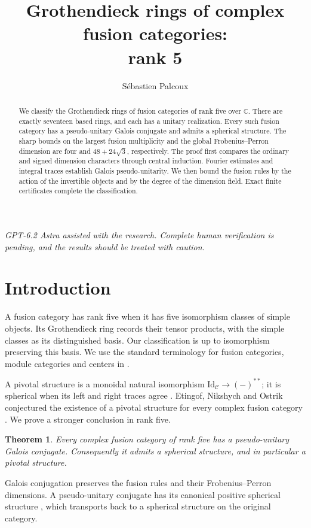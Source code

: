 \documentclass[11pt,a4paper]{article}
\title{Grothendieck rings of complex fusion categories:\\ rank 5}
\author{S\'ebastien Palcoux}\date{}
\newtheorem{maintheorem}{Theorem}
\numberwithin{equation}{section}
\begin{document}
\maketitle
\begin{abstract}
We classify the Grothendieck rings of fusion categories of rank five over
$\mathbb C$. There are exactly seventeen based rings, and each has a
unitary realization. Every such fusion category has a pseudo-unitary
Galois conjugate and admits a spherical structure. The sharp bounds on
the largest fusion multiplicity and the global Frobenius--Perron
dimension are four and $48+24\sqrt3$, respectively. The proof first
compares the ordinary and signed dimension characters through central
induction. Fourier estimates and integral traces establish Galois
pseudo-unitarity. We then bound the fusion rules by the action of the
invertible objects and by the degree of the dimension field. Exact
finite certificates complete the classification.
\end{abstract}
\begin{center}\begin{minipage}{0.88\linewidth}\small\itshape
GPT-6.2 Astra assisted with the research. Complete human verification is pending, and
the results should be treated with caution.
\end{minipage}\end{center}

{\small\tableofcontents}
\clearpage

\section{Introduction}
A fusion category has rank five when it has five isomorphism classes of
simple objects. Its Grothendieck ring records their tensor products,
with the simple classes as its distinguished basis. Our classification
is up to isomorphism preserving this basis. We use the standard terminology
for fusion categories, module categories and centers in
\cite[Chapters~4, 7 and~8]{EGNO}.

A pivotal structure is a monoidal natural isomorphism
$\mathrm{Id}_{\mathcal C}\to(-)^{**}$; it is spherical when its left and
right traces agree \cite[Section~2]{BW}. Etingof, Nikshych and Ostrik conjectured the
existence of a pivotal structure for every complex fusion category
\cite[Conjecture~2.8]{ENO}. We prove a stronger conclusion in rank five.
\begin{maintheorem}\label{thm:r5-galpu}
Every complex fusion category of rank five has a pseudo-unitary Galois
conjugate. Consequently it admits a spherical structure, and in
particular a pivotal structure.
\end{maintheorem}
Galois conjugation preserves the fusion rules and their
Frobenius--Perron dimensions. A pseudo-unitary conjugate has its
canonical positive spherical structure \cite[Proposition~8.23]{ENO}, which transports back to a
spherical structure on the original category.
\end{document}
